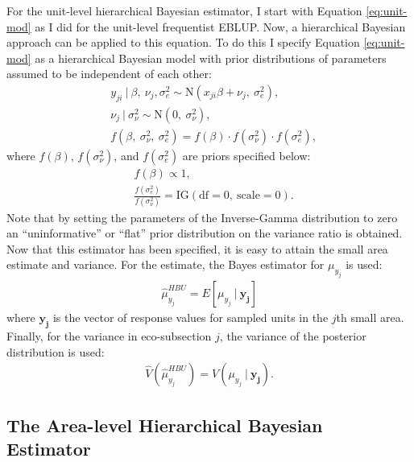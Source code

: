 \documentclass[12pt,twoside]{reedthesis}
\begin{document}
For the unit-level hierarchical Bayesian estimator, I start with Equation \eqref{eq:unit-mod} as I did for the unit-level frequentist EBLUP. Now, a hierarchical Bayesian approach can be applied to this equation. To do this I specify Equation \eqref{eq:unit-mod} as a hierarchical Bayesian model with prior distributions of parameters assumed to be independent of each other:
\begin{align}
&y_{ji} ~\vert~ \beta,~ \nu_j, \sigma^2_e \sim \text{N}(x_{ji}\beta + \nu_j,~ \sigma^2_e), \nonumber \\
&\nu_j ~\vert~ \sigma^2_\nu \sim \text{N}(0,~ \sigma^2_\nu),\nonumber \\
&f(\beta,~ \sigma^2_\nu, ~\sigma^2_e) = f(\beta)\cdot f(\sigma^2_\nu) \cdot f(\sigma^2_e),
\end{align}
where \(f(\beta)\), \(f(\sigma^2_\nu)\), and \(f(\sigma^2_e)\) are priors specified below:
\begin{align*}
&f(\beta) \propto 1, \\
&\frac{f(\sigma^2_e)}{f(\sigma^2_\nu)} = \text{IG}(\text{df} = 0,~ \text{scale} = 0).
\end{align*}
Note that by setting the parameters of the Inverse-Gamma distribution to zero an ``uninformative'' or ``flat'' prior distribution on the variance ratio is obtained. Now that this estimator has been specified, it is easy to attain the small area estimate and variance. For the estimate, the Bayes estimator for \(\mu_{y_j}\) is used:
\begin{align}
\hat\mu_{y_j}^{HBU} = E[\mu_{y_j} ~\vert~ \mathbf{y_j}]
\end{align}
where \(\mathbf{y_j}\) is the vector of response values for sampled units in the \(j\)th small area. Finally, for the variance in eco-subsection \(j\), the variance of the posterior distribution is used:
\begin{align}
\hat V(\hat \mu_{y_j}^{HBU}) = V(\mu_{y_j} ~\vert~ \mathbf{y_j}).
\end{align}
\hypertarget{the-area-level-hierarchical-bayesian-estimator}{%
\subsection{The Area-level Hierarchical Bayesian Estimator}\label{the-area-level-hierarchical-bayesian-estimator}}
\end{document}
